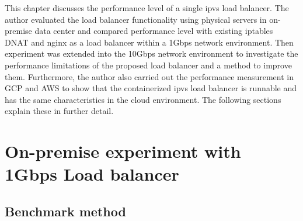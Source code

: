 This chapter discusses the performance level of a single ipvs load balancer.
The author evaluated the load balancer functionality using physical servers in on-premise data center and compared performance level with existing iptables DNAT and nginx as a load balancer within a 1Gbps network environment.
Then experiment was extended into the 10Gbps network environment to investigate the performance limitations of the proposed load balancer and a method to improve them.
Furthermore, the author also carried out the performance measurement in GCP and AWS to show that the containerized ipvs load balancer is runnable and has the same characteristics in the cloud environment.
The following sections explain these in further detail.

\section{On-premise experiment with 1Gbps Load balancer}
\subsection{Benchmark method}

